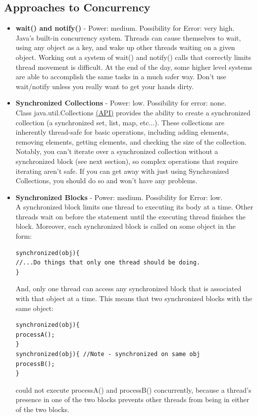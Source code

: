 \documentclass[11pt]{article}
\begin{document}
\subsection{Approaches to Concurrency}
\begin{itemize}
\item \textbf{wait() and notify()} - Power: medium. Possibility for Error: very high.\\
Java's built-in concurrency system. Threads can cause themselves to wait, using any object as a key, and wake up other threads waiting on a given object. Working out a system of wait() and notify() calls that correctly limits thread movement is difficult. At the end of the day, some higher level systems are able to accomplish the same tasks in a much safer way. Don't use wait/notify unless you really want to get your hands dirty.
\item \textbf{Synchronized Collections} - Power: low. Possibility for error: none. \\
Class java.util.Collections \href{http://docs.oracle.com/javase/7/docs/api/java/util/Collections.html\#synchronizedCollection(java.util.Collection)}{({\color{blue}\underline{API}})} provides the ability to create a synchronized collection (a synchronized set, list, map, etc...). These collections are inherently thread-safe for basic operations, including adding elements, removing elements, getting elements, and checking the size of the collection. Notably, you can't iterate over a synchronized collection without a synchronized block (see next section), so complex operations that require iterating aren't safe. If you can get away with just using Synchronized Collections, you should do so and won't have any problems.
\item \textbf{Synchronized Blocks} - Power: medium. Possibility for Error: low.\\
A synchronized block limits one thread to executing its body at a time. Other threads wait on before the statement until the executing thread finishes the block. Moreover, each synchronized block is called on some object in the form:\\

\begin{lstlisting}[frame=single]
synchronized(obj){
//...Do things that only one thread should be doing.
}
\end{lstlisting}
And, only one thread can access any synchronized block that is associated with that object at a time. This means that two synchronized blocks with the same object:\\
\begin{lstlisting}[frame=single]
synchronized(obj){
processA();
}
synchronized(obj){ //Note - synchronized on same obj
processB();
}
\end{lstlisting}
could not execute processA() and processB()  concurrently, because a thread's presence in one of the two blocks prevents other threads from being in either of the two blocks.


\end{itemize}
\end{document}
